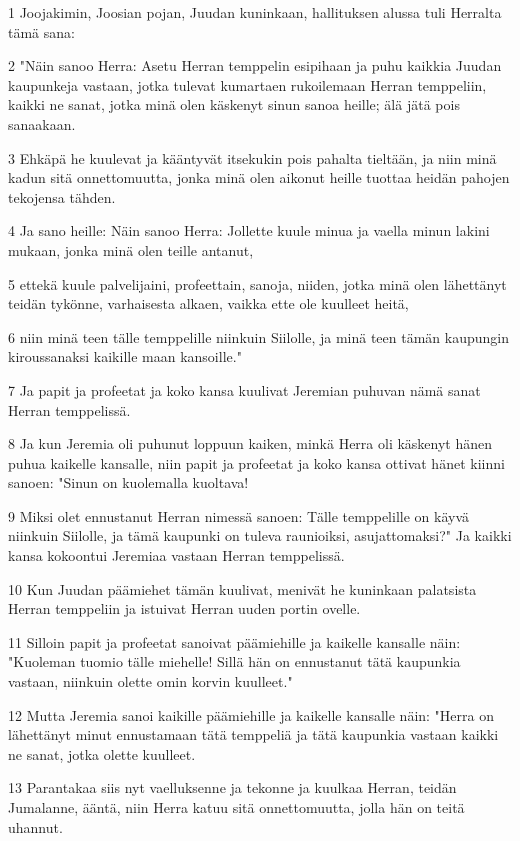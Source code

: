 \par 1 Joojakimin, Joosian pojan, Juudan kuninkaan, hallituksen alussa tuli Herralta tämä sana:
\par 2 "Näin sanoo Herra: Asetu Herran temppelin esipihaan ja puhu kaikkia Juudan kaupunkeja vastaan, jotka tulevat kumartaen rukoilemaan Herran temppeliin, kaikki ne sanat, jotka minä olen käskenyt sinun sanoa heille; älä jätä pois sanaakaan.
\par 3 Ehkäpä he kuulevat ja kääntyvät itsekukin pois pahalta tieltään, ja niin minä kadun sitä onnettomuutta, jonka minä olen aikonut heille tuottaa heidän pahojen tekojensa tähden.
\par 4 Ja sano heille: Näin sanoo Herra: Jollette kuule minua ja vaella minun lakini mukaan, jonka minä olen teille antanut,
\par 5 ettekä kuule palvelijaini, profeettain, sanoja, niiden, jotka minä olen lähettänyt teidän tykönne, varhaisesta alkaen, vaikka ette ole kuulleet heitä,
\par 6 niin minä teen tälle temppelille niinkuin Siilolle, ja minä teen tämän kaupungin kiroussanaksi kaikille maan kansoille."
\par 7 Ja papit ja profeetat ja koko kansa kuulivat Jeremian puhuvan nämä sanat Herran temppelissä.
\par 8 Ja kun Jeremia oli puhunut loppuun kaiken, minkä Herra oli käskenyt hänen puhua kaikelle kansalle, niin papit ja profeetat ja koko kansa ottivat hänet kiinni sanoen: "Sinun on kuolemalla kuoltava!
\par 9 Miksi olet ennustanut Herran nimessä sanoen: Tälle temppelille on käyvä niinkuin Siilolle, ja tämä kaupunki on tuleva raunioiksi, asujattomaksi?" Ja kaikki kansa kokoontui Jeremiaa vastaan Herran temppelissä.
\par 10 Kun Juudan päämiehet tämän kuulivat, menivät he kuninkaan palatsista Herran temppeliin ja istuivat Herran uuden portin ovelle.
\par 11 Silloin papit ja profeetat sanoivat päämiehille ja kaikelle kansalle näin: "Kuoleman tuomio tälle miehelle! Sillä hän on ennustanut tätä kaupunkia vastaan, niinkuin olette omin korvin kuulleet."
\par 12 Mutta Jeremia sanoi kaikille päämiehille ja kaikelle kansalle näin: "Herra on lähettänyt minut ennustamaan tätä temppeliä ja tätä kaupunkia vastaan kaikki ne sanat, jotka olette kuulleet.
\par 13 Parantakaa siis nyt vaelluksenne ja tekonne ja kuulkaa Herran, teidän Jumalanne, ääntä, niin Herra katuu sitä onnettomuutta, jolla hän on teitä uhannut.

